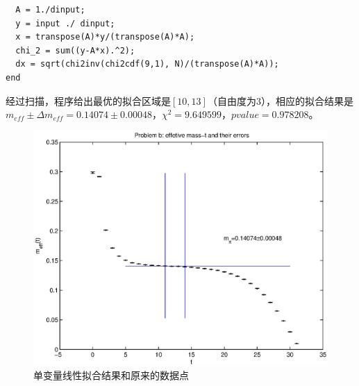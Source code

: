 \documentclass[paper=a4, fontsize=11pt]{scrartcl} %
\numberwithin{equation}{section} %
\numberwithin{figure}{section} %
\numberwithin{table}{section} %
\begin{document}
\begin{CJK*}{UTF8}{gbsn}
\begin{lstlisting}
  A = 1./dinput;
  y = input ./ dinput;
  x = transpose(A)*y/(transpose(A)*A);
  chi_2 = sum((y-A*x).^2);
  dx = sqrt(chi2inv(chi2cdf(9,1), N)/(transpose(A)*A));
end
\end{lstlisting}
经过扫描，程序给出最优的拟合区域是$[10,13]$（自由度为3），相应的拟合结果是$m_{eff}\pm \Delta m_{eff}=0.14074\pm0.00048$，$\chi^2=9.649599$，$pvalue=0.978208$。
\begin{figure}[H]
\centering
\includegraphics[width=150mm]{problem3_c_1.eps}
\caption{单变量线性拟合结果和原来的数据点}
\end{figure}


\end{CJK*}
\end{document}
